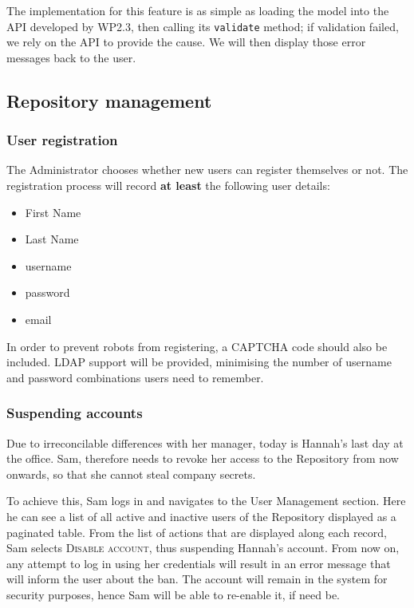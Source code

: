{\begin{techNote}
The implementation for this feature is as simple as loading the model into the API developed by WP2.3, then calling its \texttt{validate} method; if validation failed, we rely on the API to provide the cause. We will then display those error messages back to the user.
\end{techNote}

\subsection{Repository management} 

\subsubsection{User registration}
The Administrator chooses whether new users can register themselves or not. The registration process will record \textbf{at least} the following user details:
\begin{itemize}
\item First Name
\item Last Name
\item username
\item password
\item email
\end{itemize}


\begin{techNote}
In order to prevent robots from registering, a CAPTCHA code should also be included. LDAP support will be provided, minimising the number of username and password combinations users need to remember. 
\end{techNote}


\subsubsection{Suspending accounts}
Due to irreconcilable differences with her manager, today is Hannah's last day at the office. Sam, therefore needs to revoke her access to the Repository from now onwards, so that she cannot steal company secrets. 

To achieve this, Sam logs in and navigates to the User Management section. Here he can see a list of all active and inactive users of the Repository displayed as a paginated table. From the list of actions that are displayed along each record, Sam selects \textsc{Disable account}, thus suspending Hannah's account. From now on, any attempt to log in using her credentials will result in an error message that will inform the user about the ban. The account will remain in the system for security purposes, hence Sam will be able to re-enable it, if need be.

}
